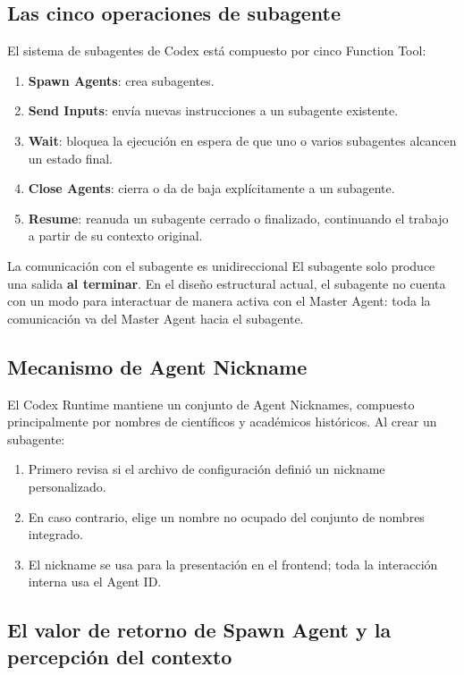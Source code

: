 \documentclass[a4paper]{article}
\begin{document}
\subsection{Las cinco operaciones de subagente}

El sistema de subagentes de Codex está compuesto por cinco Function Tool:

\begin{enumerate}
    \item \textbf{Spawn Agents}: crea subagentes.
    \item \textbf{Send Inputs}: envía nuevas instrucciones a un subagente existente.
    \item \textbf{Wait}: bloquea la ejecución en espera de que uno o varios subagentes alcancen un estado final.
    \item \textbf{Close Agents}: cierra o da de baja explícitamente a un subagente.
    \item \textbf{Resume}: reanuda un subagente cerrado o finalizado, continuando el trabajo a partir de su contexto original.
\end{enumerate}

\begin{warningbox}{La comunicación con el subagente es unidireccional}
El subagente solo produce una salida \textbf{al terminar}. En el diseño estructural actual, el subagente no cuenta con un modo para interactuar de manera activa con el Master Agent: toda la comunicación va del Master Agent hacia el subagente.
\end{warningbox}

\subsection{Mecanismo de Agent Nickname}

El Codex Runtime mantiene un conjunto de Agent Nicknames, compuesto principalmente por nombres de científicos y académicos históricos. Al crear un subagente:
\begin{enumerate}
    \item Primero revisa si el archivo de configuración definió un nickname personalizado.
    \item En caso contrario, elige un nombre no ocupado del conjunto de nombres integrado.
    \item El nickname se usa para la presentación en el frontend; toda la interacción interna usa el Agent ID.
\end{enumerate}

\subsection{El valor de retorno de Spawn Agent y la percepción del contexto}
\end{document}
